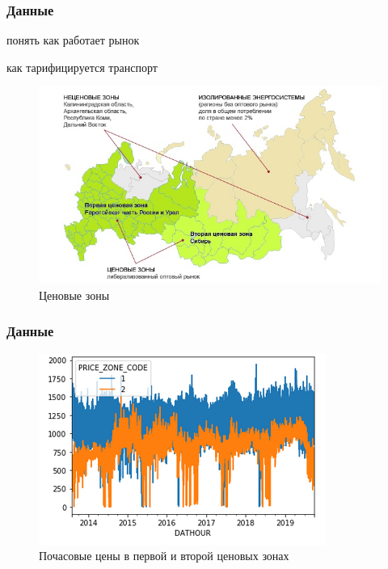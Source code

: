 \documentclass[c, dvipsnames]{beamer}  %
\begin{document}
\begin{frame}[shrink=5]
\frametitle{Данные} 



понять как работает рынок

как тарифицируется транспорт 

\begin{figure}
	\centering
	\includegraphics[width=0.7\linewidth]{screenshot003}
	\caption{ Ценовые зоны  }
	\label{fig:screenshot003}
\end{figure}

\end{frame}





\begin{frame}[shrink=5]
\frametitle{Данные} 





\begin{figure}
	\centering
	\includegraphics[width=0.7\linewidth]{screenshot002}
	\caption{ Почасовые цены в первой и второй ценовых зонах }
	\label{fig:screenshot002}
\end{figure}

\end{frame}
\end{document}

